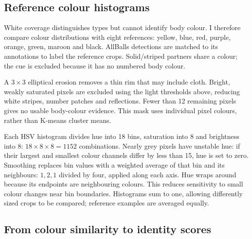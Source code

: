 \documentclass[12pt,a4paper]{article}
\begin{document}
\subsection{Reference colour histograms}

White coverage distinguishes types but cannot identify body colour. I therefore
compare colour distributions with eight references: yellow, blue, red, purple,
orange, green, maroon and black. AllBalls detections are matched to its annotations
to label the reference crops. Solid/striped partners share a colour; the cue is
excluded because it has no numbered body colour.

A $3\times3$ elliptical erosion removes a thin rim that may include cloth.
Bright, weakly saturated pixels are excluded using the light thresholds above,
reducing white stripes, number patches and reflections. Fewer than 12 remaining
pixels gives no usable body-colour evidence. This mask uses individual pixel
colours, rather than K-means cluster means.


Each HSV histogram divides hue into 18 bins, saturation into 8 and brightness
into 8: $18\times8\times8=1152$ combinations. Nearly grey pixels have unstable
hue: if their largest and smallest colour channels differ by less than 15, hue
is set to zero. Smoothing replaces
bin values with a weighted average of that bin and its neighbours: $1,2,1$ divided
by four, applied along each axis. Hue wraps around because its endpoints are
neighbouring colours. This reduces sensitivity to small colour changes near bin
boundaries. Histograms sum to one, allowing differently sized crops to
be compared; reference examples are averaged equally.
\newpage

\subsection{From colour similarity to identity scores}
\end{document}
